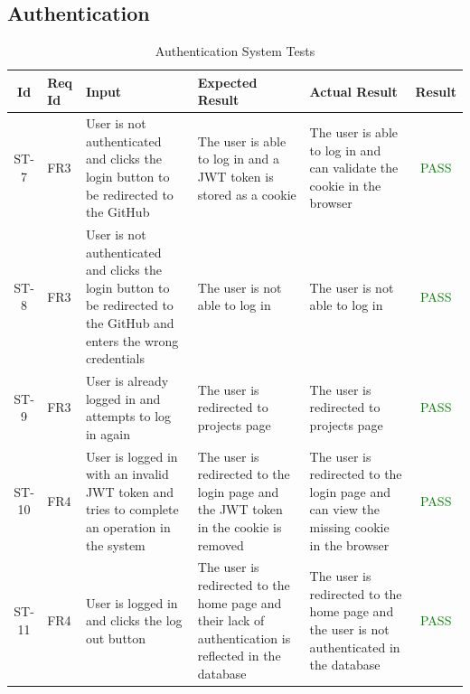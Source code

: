 \documentclass[12pt, titlepage]{article}
\begin{document}
\subsection{Authentication}
\begin{center}
    \begin{longtable}{|c|p{1cm}|p{2.7cm}|p{3cm}|p{3cm}|c|}
        \caption{Authentication System Tests \label{long}}\\
        \hline
        \textbf{Id} & \textbf{Req Id} & \textbf{Input} & \textbf{Expected Result} & \textbf{Actual Result} & \textbf{Result} \\
        \hline
        ST-7 & FR3 & User is not authenticated and clicks the login button to be redirected to the GitHub & The user is able to log in and a JWT token is stored as a cookie & The user is able to log in and can validate the cookie in the browser & \textcolor{green}{PASS} \\
        \hline
        ST-8 & FR3 & User is not authenticated and clicks the login button to be redirected to the GitHub and enters the wrong credentials & The user is not able to log in & The user is not able to log in & \textcolor{green}{PASS} \\
        \hline
        ST-9 & FR3 & User is already logged in and attempts to log in again & The user is redirected to projects page & The user is redirected to projects page & \textcolor{green}{PASS} \\
        \hline
        ST-10 & FR4 & User is logged in with an invalid JWT token and tries to complete an operation in the system & The user is redirected to the login page and the JWT token in the cookie is removed & The user is redirected to the login page and can view the missing cookie in the browser & \textcolor{green}{PASS} \\ 
        \hline
        ST-11 & FR4 & User is logged in and clicks the log out button & The user is redirected to the home page and their lack of authentication is reflected in the database & The user is redirected to the home page and the user is not authenticated in the database & \textcolor{green}{PASS} \\
        \hline
    \end{longtable}
\end{center}
\end{document}
